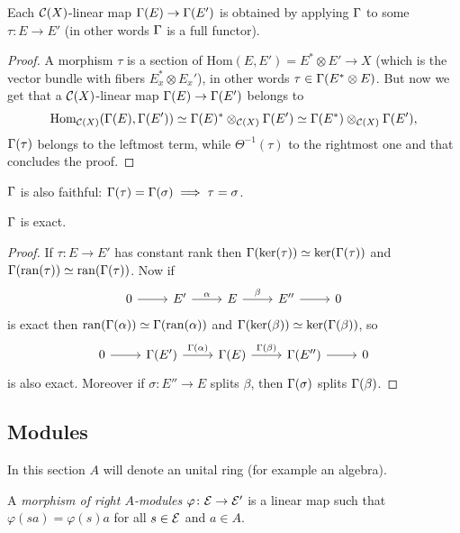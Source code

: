 \begin{corollary}
 Each $\mathcal{C}(X)$-linear map $\Gamma(E)\to\Gamma(E')$ is obtained by applying $\Gamma$ to some $\tau\colon E\to E'$ (in other words $\Gamma$ is a full functor).
\end{corollary}
\begin{proof}
 A morphism $\tau$ is a section of $\mathrm{Hom}(E,E')=E^\ast\otimes E'\to X$ (which is the vector bundle with fibers $E_x^\ast\otimes E_x'$), in other words $\tau\in\Gamma(E^\ast\otimes E)$. But now we get that a $\mathcal{C}(X)$-linear map $\Gamma(E)\to\Gamma(E')$ belongs to $$\mathrm{Hom}_{\mathcal{C}(X)}(\Gamma(E),\Gamma(E'))\simeq\Gamma(E)^\ast\otimes_{\mathcal{C}(X)}\Gamma(E')\simeq\Gamma(E^\ast)\otimes_{\mathcal{C}(X)}\Gamma(E'),$$
 $\Gamma(\tau)$ belongs to the leftmost term, while $\Theta^{-1}(\tau)$ to the rightmost one and that concludes the proof.
\end{proof}
\begin{remark}
 $\Gamma$ is also faithful: $\Gamma(\tau)=\Gamma(\sigma)\implies\tau=\sigma$.
\end{remark}
\begin{lemma}\label{lemma: Gamma is exact}
 $\Gamma$ is exact.
\end{lemma}
\begin{proof}
 If $\tau\colon E\to E'$ has constant rank then $\Gamma(\ker(\tau))\simeq\ker(\Gamma(\tau))$ and $\Gamma(\mathrm{ran}(\tau))\simeq\mathrm{ran}(\Gamma(\tau))$. Now if $$\begin{tikzcd}0\arrow[r] & E'\arrow["\alpha",r] & E \arrow["\beta",r] & E''\arrow[r] & 0 \end{tikzcd}$$ is exact then $\mathrm{ran}(\Gamma(\alpha))\simeq\Gamma(\mathrm{ran}(\alpha))$ and $\Gamma(\ker(\beta))\simeq\ker(\Gamma(\beta))$, so 
 $$\begin{tikzcd}0\arrow[r] & \G(E')\arrow["\G(\alpha)",r] & \G(E) \arrow["\G(\beta)",r] & \G(E'')\arrow[r] & 0 \end{tikzcd}$$ is also exact. Moreover if $\sigma\colon E''\to E$ splits $\beta$, then $\Gamma(\sigma)$ splits $\Gamma(\beta)$.
\end{proof}

\subsection{Modules}
In this section $A$ will denote an unital ring (for example an algebra).

\begin{definition}
 A \emph{morphism of right $A$-modules} $\varphi\colon\mathcal{E}\to\mathcal{E}'$ is a linear map such that $\varphi(sa)=\varphi(s)a$ for all $s\in\mathcal{E}$ and $a\in A$.
\end{definition}


